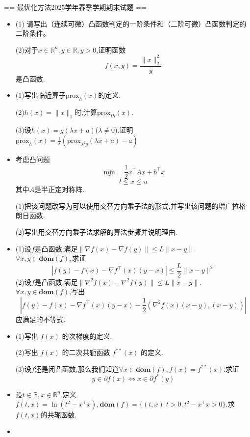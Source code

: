 == 最优化方法2025学年春季学期期末试题 ==
\begin{itemize}
\item[一、] (1) 请写出（连续可微）凸函数判定的一阶条件和（二阶可微）凸函数判定的二阶条件。

(2)对于$x\in\mathbb{R}^n,y\in\mathbb{R},y>0$,证明函数
$$f(x,y)=\frac{\|x\|^2_2}{y}$$
是凸函数.

\item[二、](1)写出临近算子$\text{prox}_h(x)$的定义.\par
(2)$h(x)=\|x\|_1$时,计算$\text{prox}_{th}(x)$.\par
(3)设$h(x)=g(\lambda x+a)$($\lambda\neq0$).证明$\text{prox}_h(x)=\frac{1}{\lambda}(\text{prox}_{\lambda^2g}(\lambda x+a)-a)$

\item[三、]考虑凸问题
$$\min\limits_x \quad\frac{1}{2}x^\top Ax+b^\top x$$
$$l\leq x\leq u$$
其中$A$是半正定对称阵.\par
(1)把该问题改写为可以使用交替方向乘子法的形式,并写出该问题的增广拉格朗日函数.\par
(2)写出用交替方向乘子法求解的算法步骤并说明理由.

\item[四、](1)设$f$是凸函数,满足$\|\nabla f(x)-\nabla f(y)\|\leq L\|x-y\|$.$\forall x
,y\in\textbf{dom}(f),$求证
$$|f(y)-f(x)-\nabla f^\top(x)(y-x)|\leq \frac{L}{2}\|x-y\|^2$$
(2)设$f$是凸函数,满足$\|\nabla^2 f(x)-\nabla^2 f(y)\|\leq L\|x-y\|$.$\forall x
,y\in\textbf{dom}(f)$,写出
$$|f(y)-f(x)-\nabla f^\top(x)(y-x)-\frac{1}{2}(\nabla^2f(x)(x-y),(x-y))|$$
应满足的不等式.

\item[五、](1)写出 $f(x)$ 的次梯度的定义.\par
(2)写出 $f(x)$ 的二次共轭函数 $f^{**}(x)$ 的定义.\par
(3)设$f$还是闭凸函数,那么我们知道$\forall x\in\textbf{dom}(f), f(x)=f^{**}(x)$.求证
$$y\in\partial f(x) \Leftrightarrow x\in\partial f^{*}(y)$$

\item[六、]设$t\in\mathbb{R},x\in\mathbb{R}^n$.定义$f(t,x)=\ln (t^2-x^\top x),\textbf{dom}(f)=\{(t,x)|t>0,t^2-x^\top x>0\}$.求$f(t,x)$的共轭函数.


\end{itemize}
\begin{proofc}[提示]
    \begin{itemize}
    \item[一、]

\end{itemize}
\end{proofc}

